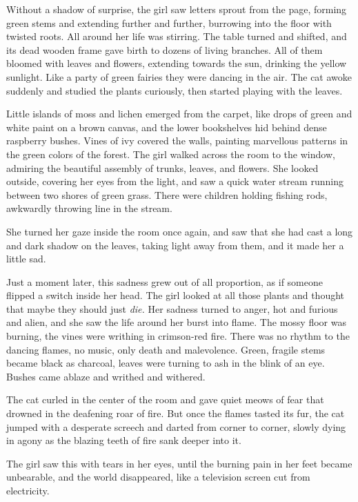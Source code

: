 \documentclass[openany, oneside]{book}
\begin{document}
Without a shadow of surprise, the girl saw letters sprout from the page, forming green stems and extending further and further, burrowing into the floor with twisted roots.
All around her life was stirring.
The table turned and shifted, and its dead wooden frame gave birth to dozens of living branches.
All of them bloomed with leaves and flowers, extending towards the sun, drinking the yellow sunlight.
Like a party of green fairies they were dancing in the air.
The cat awoke suddenly and studied the plants curiously, then started playing with the leaves.

Little islands of moss and lichen emerged from the carpet, like drops of green and white paint on a brown canvas, and the lower bookshelves hid behind dense raspberry bushes.
Vines of ivy covered the walls, painting marvellous patterns in the green colors of the forest. The girl walked across the room to the window, admiring the beautiful assembly of trunks, leaves, and flowers.
She looked outside, covering her eyes from the light, and saw a quick water stream running between two shores of green grass. There were children holding fishing rods, awkwardly throwing line in the stream.

She turned her gaze inside the room once again, and saw that she had cast a long and dark shadow on the leaves, taking light away from them, and it made her a little sad.

Just a moment later, this sadness grew out of all proportion, as if someone flipped a switch inside her head.
The girl looked at all those plants and thought that maybe they should just \emph{die.}
Her sadness turned to anger, hot and furious and alien, and she saw the life around her burst into flame.
The mossy floor was burning, the vines were writhing in crimson-red fire.
There was no rhythm to the dancing flames, no music, only death and malevolence.
Green, fragile stems became black as charcoal, leaves were turning to ash in the blink of an eye.
Bushes came ablaze and writhed and withered.

The cat curled in the center of the room and gave quiet meows of fear that drowned in the deafening roar of fire.
But once the flames tasted its fur, the cat jumped with a desperate screech and darted from corner to corner, slowly dying in agony as the blazing teeth of fire sank deeper into it.

The girl saw this with tears in her eyes, until the burning pain in her feet became unbearable, and the world disappeared, like a television screen cut from electricity.
\end{document}
